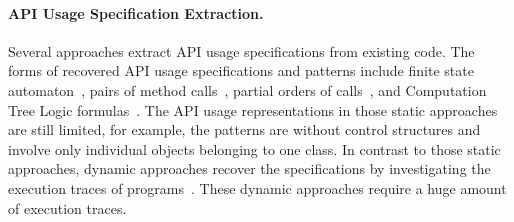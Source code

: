 \paragraph{{API Usage Specification Extraction.}} 
Several approaches extract API usage specifications from existing code. The forms of recovered API usage specifications and patterns include finite state automaton~\cite{zeller07,doc2spec}, pairs of method calls~\cite{Livshits2005,williams-tse05}, partial orders of calls~\cite{mapo-fse07,taoxie-ase09}, and Computation Tree Logic formulas~\cite{zeller-ase09}. The API usage representations in those static approaches are still limited, for example, the patterns are without control structures and involve only individual objects belonging to one class. In contrast to those static approaches, dynamic approaches recover the specifications by investigating the execution traces of programs~\cite{javert,perracotta,shoham-issta07,ramanathan-isce07,mike-ase09}. These dynamic approaches require a huge amount of execution traces.  


 
